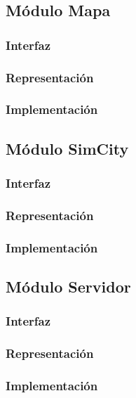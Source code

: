 \documentclass[]{aed2-tp}
\begin{document}
\subsection{Módulo Mapa}
\subsubsection{Interfaz}


\subsubsection{Representación}


\newpage
\subsubsection{Implementación}


\newpage
\subsection{Módulo SimCity}
\subsubsection{Interfaz}


\newpage
\subsubsection{Representación}


\newpage
\subsubsection{Implementación}


\newpage
\subsection{Módulo Servidor}
\subsubsection{Interfaz}


\newpage
\subsubsection{Representación}


\newpage
\subsubsection{Implementación}

\end{document}
